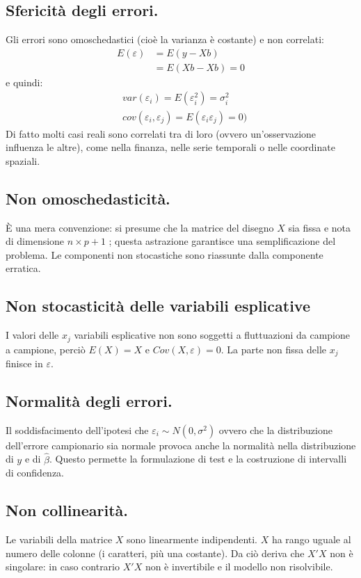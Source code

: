 \documentclass[11pt, twocolumn]{article}
\begin{document}
\subsection*{Sfericità degli errori.}
Gli errori sono omoschedastici (cioè la varianza è costante) e non correlati:
\begin{align*}
  E(\varepsilon) &= E(y - Xb) \\
                 &= E(Xb - Xb) = 0
\end{align*}
e quindi:
\begin{align*}
  &var(\varepsilon_i) = E(\varepsilon_i^2) = \sigma_i^2 \\
  &cov(\varepsilon_i, \varepsilon_j) = E(\varepsilon_i\varepsilon_j) = 0)
\end{align*}
Di fatto molti casi reali sono correlati tra di loro (ovvero un'osservazione influenza le altre), come nella finanza, nelle serie temporali o nelle coordinate spaziali.

\subsection*{Non omoschedasticità.}
È una mera convenzione: si presume che la matrice del disegno $X$ sia fissa e nota di dimensione $n \times p+1$ ; questa astrazione garantisce una semplificazione del problema.
Le componenti non stocastiche sono riassunte dalla componente erratica.

\subsection*{Non stocasticità delle variabili esplicative}
I valori delle $x_j$ variabili esplicative non sono soggetti a fluttuazioni da campione a campione, perciò $E(X) = X$ e $Cov(X,\varepsilon) = 0$. La parte non fissa delle $x_j$ finisce in $\varepsilon$.

\subsection*{Normalità degli errori.}
Il soddisfacimento dell'ipotesi che $\varepsilon_i \sim N(0,\sigma^2)$ ovvero che la distribuzione dell’errore campionario sia normale provoca anche la normalità nella distribuzione di $y$ e di $\hat{\beta}$.
Questo permette la formulazione di test e la costruzione di intervalli di confidenza.


\subsection*{Non collinearità.}
Le variabili della matrice $X$ sono linearmente indipendenti. $X$ ha rango uguale al numero delle colonne (i caratteri, più una costante). Da ciò deriva che $X'X$ non è singolare: in caso contrario $X'X$ non è invertibile e il modello non risolvibile.
\end{document}
